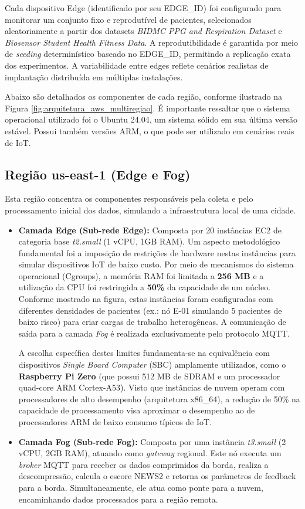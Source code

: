 \documentclass[twoside,english,brazilian]{UNISINOSmonografia}
\begin{document}
Cada dispositivo Edge (identificado por seu EDGE\_ID) foi configurado para monitorar um conjunto fixo e reprodutível de pacientes, selecionados aleatoriamente a partir dos datasets \textit{BIDMC PPG and Respiration Dataset} e \textit{Biosensor Student Health Fitness Data}. A reprodutibilidade é garantida por meio de \textit{seeding} determinístico baseado no EDGE\_ID, permitindo a replicação exata dos experimentos. A variabilidade entre edges reflete cenários realistas de implantação distribuída em múltiplas instalações.

Abaixo são detalhados os componentes de cada região, conforme ilustrado na Figura \ref{fig:arquitetura_aws_multiregiao}. É importante ressaltar que o sistema operacional utilizado foi o Ubuntu 24.04, um sistema sólido em sua última versão estável. Possui também versões ARM, o que pode ser utilizado em cenários reais de IoT.

\subsection{Região us-east-1 (Edge e Fog)}

Esta região concentra os componentes responsáveis pela coleta e pelo processamento inicial dos dados, simulando a infraestrutura local de uma cidade.

\begin{itemize}
    \item \textbf{Camada Edge (Sub-rede Edge):} Composta por 20 instâncias EC2 de categoria base \textit{t2.small} (1 vCPU, 1GB RAM). Um aspecto metodológico fundamental foi a imposição de restrições de hardware nestas instâncias para simular dispositivos IoT de baixo custo. Por meio de mecanismos do sistema operacional (Cgroups), a memória RAM foi limitada a \textbf{256 MB} e a utilização da CPU foi restringida a \textbf{50\%} da capacidade de um núcleo. Conforme mostrado na figura, estas instâncias foram configuradas com diferentes densidades de pacientes (ex.: nó E-01 simulando 5 pacientes de baixo risco) para criar cargas de trabalho heterogêneas. A comunicação de saída para a camada \textit{Fog} é realizada exclusivamente pelo protocolo MQTT.

    A escolha específica destes limites fundamenta-se na equivalência com dispositivos \textit{Single Board Computer} (SBC) amplamente utilizados, como o \textbf{Raspberry Pi Zero} (que possui 512 MB de SDRAM e um processador quad-core ARM Cortex-A53). Visto que instâncias de nuvem operam com processadores de alto desempenho (arquitetura x86\_64), a redução de 50\% na capacidade de processamento visa aproximar o desempenho ao de processadores ARM de baixo consumo típicos de IoT.

    \item \textbf{Camada Fog (Sub-rede Fog):} Composta por uma instância \textit{t3.small} (2 vCPU, 2GB RAM), atuando como \textit{gateway} regional. Este nó executa um \textit{broker} MQTT para receber os dados comprimidos da borda, realiza a descompressão, calcula o escore NEWS2 e retorna os parâmetros de feedback para a borda. Simultaneamente, ele atua como ponte para a nuvem, encaminhando dados processados para a região remota.
\end{itemize}
\end{document}

